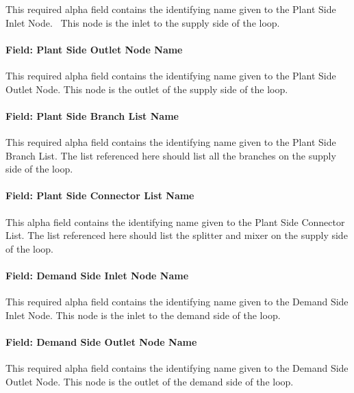 This required alpha field contains the identifying name given to the Plant Side Inlet Node.~ This node is the inlet to the supply side of the loop.

\paragraph{Field: Plant Side Outlet Node Name}\label{field-plant-side-outlet-node-name}

This required alpha field contains the identifying name given to the Plant Side Outlet Node. This node is the outlet of the supply side of the loop.

\paragraph{Field: Plant Side Branch List Name}\label{field-plant-side-branch-list-name}

This required alpha field contains the identifying name given to the Plant Side Branch List. The list referenced here should list all the branches on the supply side of the loop.

\paragraph{Field: Plant Side Connector List Name}\label{field-plant-side-connector-list-name}

This alpha field contains the identifying name given to the Plant Side Connector List. The list referenced here should list the splitter and mixer on the supply side of the loop.

\paragraph{Field: Demand Side Inlet Node Name}\label{field-demand-side-inlet-node-name}

This required alpha field contains the identifying name given to the Demand Side Inlet Node. This node is the inlet to the demand side of the loop.

\paragraph{Field: Demand Side Outlet Node Name}\label{field-demand-side-outlet-node-name-000}

This required alpha field contains the identifying name given to the Demand Side Outlet Node. This node is the outlet of the demand side of the loop.

